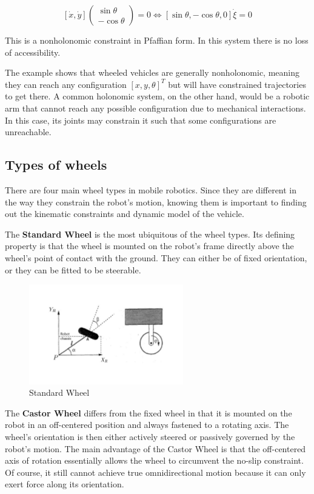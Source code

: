 \documentclass[twoside]{article}
\begin{document}
$$
[\dot{x},  \dot{y}] \begin{pmatrix} \sin \theta \\ -\cos \theta \end{pmatrix} = 0 \iff
[\sin \theta, -\cos \theta, 0] \dot{\xi} = 0
$$

This is a nonholonomic constraint in Pfaffian form. In this system there is no loss of accessibility.

The example shows that wheeled vehicles are generally nonholonomic, meaning they can reach any configuration $[x,y,\theta]^T$ but will have constrained trajectories to get there. A common holonomic system, on the other hand, would be a robotic arm that cannot reach any possible configuration due to mechanical interactions. In this case, its joints may constrain it such that some configurations are unreachable.

\subsection*{Types of wheels}

There are four main wheel types in mobile robotics. Since they are different in the way they constrain the robot's motion, knowing them is important to finding out the kinematic constraints and dynamic model of the vehicle.

The \textbf{Standard Wheel} is the most ubiquitous of the wheel types. Its defining property is that the wheel is mounted on the robot's frame directly above the wheel's point of contact with the ground. They can either be of fixed orientation, or they can be fitted to be steerable\cite{sns}.

\begin{figure}[H]
\centering
\includegraphics[width=0.6\textwidth]{Standard_Wheel}
\caption{Standard Wheel}
\end{figure}


The \textbf{Castor Wheel} differs from the fixed wheel in that it is mounted on the robot in an off-centered position and always fastened to a rotating axis. The wheel's orientation is then either actively steered or passively governed by the robot's motion. The main advantage of the Castor Wheel is that the off-centered axis of rotation essentially allows the wheel to circumvent the no-slip constraint. Of course, it still cannot achieve true omnidirectional motion because it can only exert force along its orientation\cite{sns}.
\end{document}
